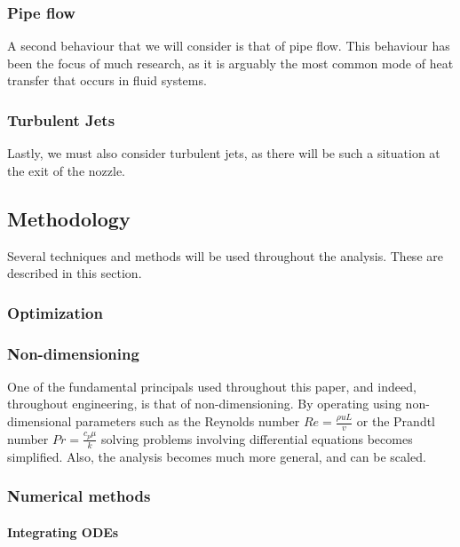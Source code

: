  
\subsubsection{Pipe flow}

A second behaviour that we will consider is that of pipe flow. This behaviour has been the focus of much research, as it is arguably the most common mode of heat transfer that occurs in fluid systems.

\subsubsection{Turbulent Jets}

Lastly, we must also consider turbulent jets, as there will be such a situation at the exit of the nozzle. \cite{pope2000}


\subsection{Methodology}

Several techniques and methods will be used throughout the analysis. These are described in this section.

\subsubsection{Optimization}
\subsubsection{Non-dimensioning}

One of the fundamental principals used throughout this paper, and indeed, throughout engineering, is that of non-dimensioning. By operating using non-dimensional parameters such as the Reynolds number $Re = \frac{\rho u L}{v}$ or the Prandtl number $Pr = \frac{c_p \mu}{k}$ solving problems involving differential equations becomes simplified. Also, the analysis becomes much more general, and can be scaled.

\subsubsection{Numerical methods}
\label{sec:numerical_methods}
\paragraph{Integrating ODEs}

